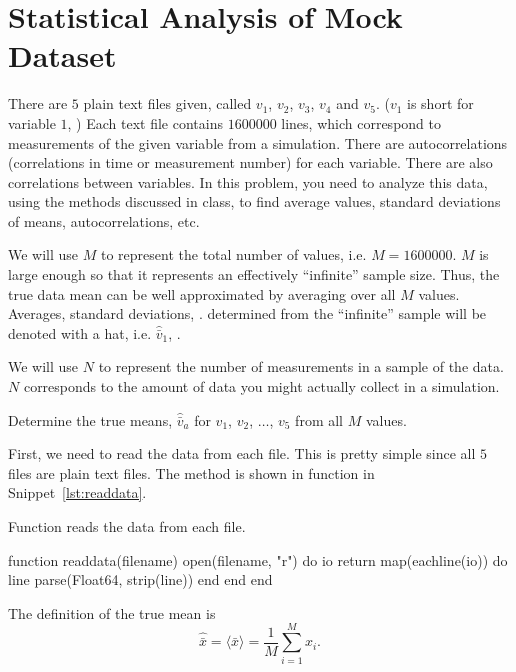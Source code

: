 \section{Statistical Analysis of Mock Dataset}

There are $5$ plain text files given, called $v_1$, $v_2$, $v_3$, $v_4$ and $v_5$. ($v_1$ is
short for variable $1$, \etc{}) Each text file contains $1600000$ lines, which correspond to
measurements of the given variable from a simulation. There are autocorrelations
(correlations in time or measurement number) for each variable. There are also correlations
between variables. In this problem, you need to analyze this data, using the methods
discussed in class, to find average values, standard deviations of means, autocorrelations,
etc.

We will use $M$ to represent the total number of values, i.e. $M = 1600000$. $M$ is large
enough so that it represents an effectively ``infinite'' sample size. Thus, the true data
mean can be well approximated by averaging over all $M$ values. Averages, standard
deviations, \etc. determined from the ``infinite'' sample will be denoted with a hat, i.e.
$\hat{\bar{v}}_1$, \etc.

We will use $N$ to represent the number of measurements in a sample of the data. $N$
corresponds to the amount of data you might actually collect in a simulation.

\Question{} Determine the true means, $\hat{\bar{v}}_a$ for $v_1$, $v_2$, $\ldots$, $v_5$ from
all $M$ values.

\Answer{}
First, we need to read the data from each file. This is pretty simple since all $5$ files
are plain text files. The method is shown in function  in
Snippet~\ref{lst:readdata}.

\begin{algorithm}[H]
    \caption{Function  reads the data from each file.}
    \label{lst:readdata}
    \begin{juliacode}
        function readdata(filename)
            open(filename, "r") do io
                return map(eachline(io)) do line
                    parse(Float64, strip(line))
                end
            end
        end
    \end{juliacode}
\end{algorithm}

The definition of the true mean is
\begin{equation}
    \hat{\bar{x}} = \bigl \langle \bar{x} \bigr \rangle = \frac{ 1 }{ M } \sum_{i=1}^{M} x_i.
\end{equation}

